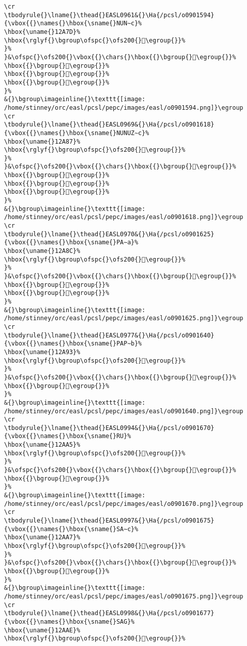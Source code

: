 \begin{verbatim}
\cr
\tbodyrule{}\lname{}\thead{}EASL0961&{}\Ha{/pcsl/o0901594}{\vbox{{}\names{}\hbox{\sname{}NUN∼c}%
\hbox{\uname{}12A7D}%
\hbox{\rglyf{}\bgroup\ofspc{}\ofs200{}𒩽\egroup{}}%
}%
}&\ofspc{}\ofs200{}\vbox{{}\chars{}\hbox{{}\bgroup{}𒩼\egroup{}}%
\hbox{{}\bgroup{}𒩽\egroup{}}%
\hbox{{}\bgroup{}𒩾\egroup{}}%
\hbox{{}\bgroup{}𒩿\egroup{}}%
}%
&{}\bgroup\imageinline{}\texttt{[image: /home/stinney/orc/easl/pcsl/pepc/images/easl/o0901594.png]}\egroup
\cr
\tbodyrule{}\lname{}\thead{}EASL0969&{}\Ha{/pcsl/o0901618}{\vbox{{}\names{}\hbox{\sname{}NUNUZ∼c}%
\hbox{\uname{}12A87}%
\hbox{\rglyf{}\bgroup\ofspc{}\ofs200{}𒪇\egroup{}}%
}%
}&\ofspc{}\ofs200{}\vbox{{}\chars{}\hbox{{}\bgroup{}𒪇\egroup{}}%
\hbox{{}\bgroup{}𒪈\egroup{}}%
\hbox{{}\bgroup{}𒪉\egroup{}}%
\hbox{{}\bgroup{}𒪊\egroup{}}%
}%
&{}\bgroup\imageinline{}\texttt{[image: /home/stinney/orc/easl/pcsl/pepc/images/easl/o0901618.png]}\egroup
\cr
\tbodyrule{}\lname{}\thead{}EASL0970&{}\Ha{/pcsl/o0901625}{\vbox{{}\names{}\hbox{\sname{}PA∼a}%
\hbox{\uname{}12A8C}%
\hbox{\rglyf{}\bgroup\ofspc{}\ofs200{}𒪌\egroup{}}%
}%
}&\ofspc{}\ofs200{}\vbox{{}\chars{}\hbox{{}\bgroup{}𒪋\egroup{}}%
\hbox{{}\bgroup{}𒪌\egroup{}}%
\hbox{{}\bgroup{}𒪍\egroup{}}%
}%
&{}\bgroup\imageinline{}\texttt{[image: /home/stinney/orc/easl/pcsl/pepc/images/easl/o0901625.png]}\egroup
\cr
\tbodyrule{}\lname{}\thead{}EASL0977&{}\Ha{/pcsl/o0901640}{\vbox{{}\names{}\hbox{\sname{}PAP∼b}%
\hbox{\uname{}12A93}%
\hbox{\rglyf{}\bgroup\ofspc{}\ofs200{}𒪓\egroup{}}%
}%
}&\ofspc{}\ofs200{}\vbox{{}\chars{}\hbox{{}\bgroup{}𒪓\egroup{}}%
\hbox{{}\bgroup{}𒪔\egroup{}}%
}%
&{}\bgroup\imageinline{}\texttt{[image: /home/stinney/orc/easl/pcsl/pepc/images/easl/o0901640.png]}\egroup
\cr
\tbodyrule{}\lname{}\thead{}EASL0994&{}\Ha{/pcsl/o0901670}{\vbox{{}\names{}\hbox{\sname{}RU}%
\hbox{\uname{}12AA5}%
\hbox{\rglyf{}\bgroup\ofspc{}\ofs200{}𒪥\egroup{}}%
}%
}&\ofspc{}\ofs200{}\vbox{{}\chars{}\hbox{{}\bgroup{}𒪣\egroup{}}%
\hbox{{}\bgroup{}𒪥\egroup{}}%
}%
&{}\bgroup\imageinline{}\texttt{[image: /home/stinney/orc/easl/pcsl/pepc/images/easl/o0901670.png]}\egroup
\cr
\tbodyrule{}\lname{}\thead{}EASL0997&{}\Ha{/pcsl/o0901675}{\vbox{{}\names{}\hbox{\sname{}SA∼c}%
\hbox{\uname{}12AA7}%
\hbox{\rglyf{}\bgroup\ofspc{}\ofs200{}𒪧\egroup{}}%
}%
}&\ofspc{}\ofs200{}\vbox{{}\chars{}\hbox{{}\bgroup{}𒪧\egroup{}}%
\hbox{{}\bgroup{}𒪨\egroup{}}%
}%
&{}\bgroup\imageinline{}\texttt{[image: /home/stinney/orc/easl/pcsl/pepc/images/easl/o0901675.png]}\egroup
\cr
\tbodyrule{}\lname{}\thead{}EASL0998&{}\Ha{/pcsl/o0901677}{\vbox{{}\names{}\hbox{\sname{}SAG}%
\hbox{\uname{}12AAE}%
\hbox{\rglyf{}\bgroup\ofspc{}\ofs200{}𒪮\egroup{}}%

\end{verbatim}
